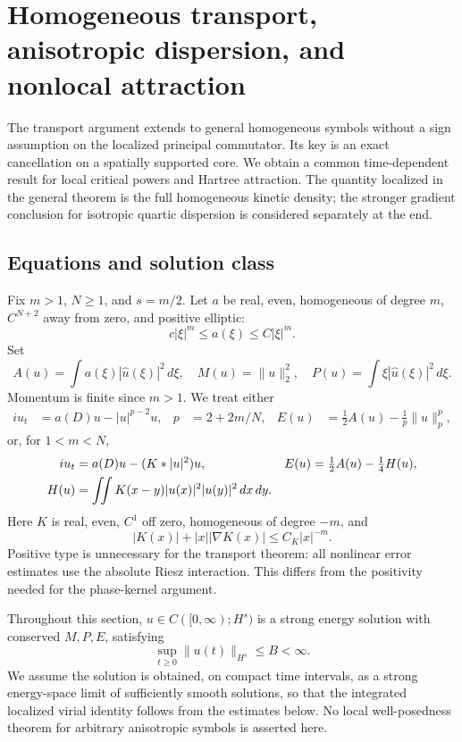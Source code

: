 \section{Homogeneous transport, anisotropic dispersion, and nonlocal attraction}
\label{sec:r11-transport}

The transport argument extends to general homogeneous symbols without a
sign assumption on the localized principal commutator. Its key is an
exact cancellation on a spatially supported core. We obtain a common
time-dependent result for local critical powers and Hartree attraction.
The quantity localized in the general theorem is the full homogeneous
kinetic density; the stronger gradient conclusion for isotropic quartic
dispersion is considered separately at the end.

\subsection{Equations and solution class}
Fix $m>1$, $N\ge1$, and $s=m/2$. Let $a$ be real, even, homogeneous
of degree $m$, $C^{N+2}$ away from zero, and positive elliptic:
\[
 c|\xi|^m\le a(\xi)\le C|\xi|^m.
\]
Set
\[
 A(u)=\int a(\xi)|\widehat u(\xi)|^2\,d\xi,
 \quad M(u)=\|u\|_2^2,
 \quad P(u)=\int\xi|\widehat u(\xi)|^2\,d\xi.
\]
Momentum is finite since $m>1$. We treat either
\begin{align}
 iu_t&=a(D)u-|u|^{p-2}u,
 &p&=2+2m/N,
 &E(u)&=\tfrac12A(u)-\tfrac1p\|u\|_p^p,
 \label{r11tr:local}
\end{align}
or, for $1<m<N$,
\begin{align}
 iu_t&=a(D)u-(K*|u|^2)u,
 &E(u)&=\tfrac12A(u)-\tfrac14H(u),
 \label{r11tr:hartree}\\
 H(u)&=\iint K(x-y)|u(x)|^2|u(y)|^2\,dx\,dy.
 \notag
\end{align}
Here $K$ is real, even, $C^1$ off zero, homogeneous of degree $-m$, and
\begin{equation}\label{r11tr:kernel}
 |K(x)|+|x||\nabla K(x)|\le C_K|x|^{-m}.
\end{equation}
Positive type is unnecessary for the transport theorem: all nonlinear
error estimates use the absolute Riesz interaction. This differs from
the positivity needed for the phase-kernel argument.

Throughout this section, $u\in C([0,\infty);H^s)$ is a strong energy
solution with conserved $M,P,E$, satisfying
\begin{equation}\label{r11tr:bound}
 \sup_{t\ge0}\|u(t)\|_{H^s}\le B<\infty.
\end{equation}
We assume the solution is obtained, on compact time intervals, as a
strong energy-space limit of sufficiently smooth solutions, so that
the integrated localized virial identity follows from the estimates
below. No local well-posedness theorem for arbitrary anisotropic
symbols is asserted here.

